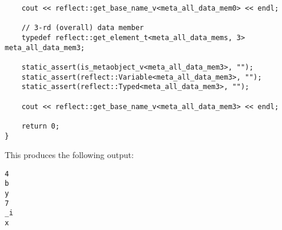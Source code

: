 \begin{verbatim}
	cout << reflect::get_base_name_v<meta_all_data_mem0> << endl;

	// 3-rd (overall) data member
	typedef reflect::get_element_t<meta_all_data_mems, 3> meta_all_data_mem3;

	static_assert(is_metaobject_v<meta_all_data_mem3>, "");
	static_assert(reflect::Variable<meta_all_data_mem3>, "");
	static_assert(reflect::Typed<meta_all_data_mem3>, "");

	cout << reflect::get_base_name_v<meta_all_data_mem3> << endl;

	return 0;
}

\end{verbatim}

This produces the following output:

\begin{verbatim}
4
b
y
7
_i
x
\end{verbatim}
